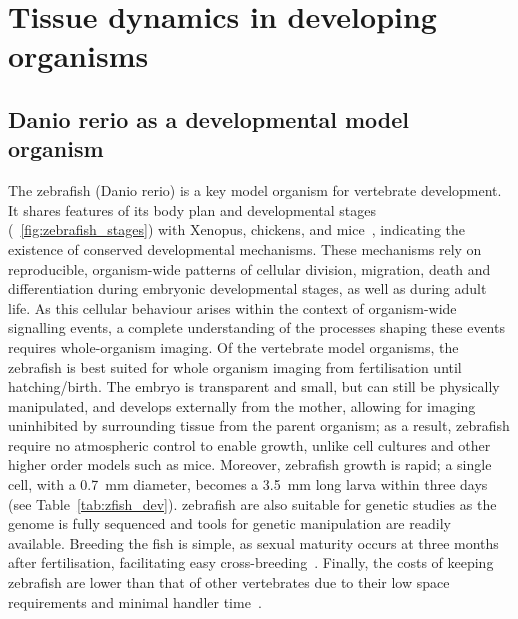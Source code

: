 
\section{Tissue dynamics in developing organisms}

\subsection{Danio rerio as a developmental model organism}
The \gls{zebrafish} (Danio rerio) is a key model organism for vertebrate development.
It shares features of its body plan and developmental stages (\figurename~\ref{fig:zebrafish_stages}) with Xenopus, chickens, and mice~\cite{wolpertPrinciplesDevelopment2006}, indicating the existence of conserved developmental mechanisms.
These mechanisms rely on reproducible, organism-wide patterns of cellular division, migration, death and differentiation during embryonic developmental stages, as well as during adult life.
As this cellular behaviour arises within the context of organism-wide signalling events, a complete understanding of the processes shaping these events requires whole-organism imaging.
Of the vertebrate model organisms, the \gls{zebrafish} is best suited for whole organism imaging from fertilisation until hatching/birth.
The embryo is transparent and small, but can still be physically manipulated, and develops externally from the mother, allowing for imaging uninhibited by surrounding tissue from the parent organism; as a result, \gls{zebrafish} require no atmospheric control to enable growth, unlike cell cultures and other higher order models such as mice.
Moreover, \gls{zebrafish} growth is rapid; a single cell, with a \SI{0.7}{\milli\meter} diameter, becomes a \SI{3.5}{\milli\meter} long larva within three days (see Table~\ref{tab:zfish_dev}).
\gls{zebrafish} are also suitable for genetic studies as the genome is fully sequenced and tools for genetic manipulation are readily available.
Breeding the fish is simple, as sexual maturity occurs at three months after fertilisation, facilitating easy cross-breeding~\cite{}.
Finally, the costs of keeping \gls{zebrafish} are lower than that of other vertebrates due to their low space requirements and minimal handler time~\cite{AnimalModelsHuman}.

